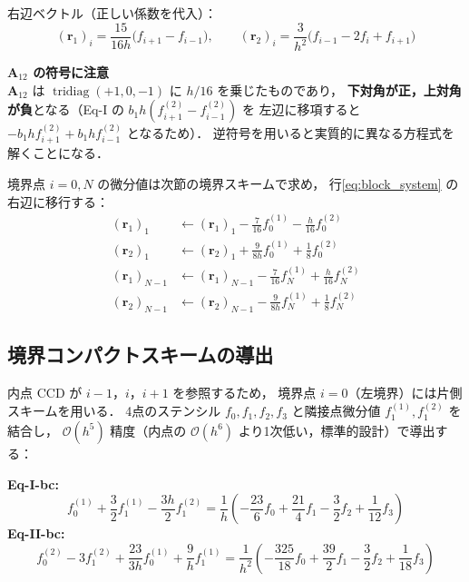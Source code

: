 \documentclass[12pt, a4paper, titlepage]{article}
\newcommand{\jp}[1]{{\normalfont\jpfont #1}}
\newcommand{\Ord}[1]{\mathcal{O}(#1)}
\newcommand{\fp}[1]{f^{(1)}_{#1}}
\newcommand{\fpp}[1]{f^{(2)}_{#1}}
\begin{document}
\jp{右辺ベクトル（正しい係数を代入）：}
\begin{equation}
  (\bm{r}_1)_i = \frac{15}{16h}\bigl(f_{i+1}-f_{i-1}\bigr),
  \qquad
  (\bm{r}_2)_i = \frac{3}{h^2}\bigl(f_{i-1}-2f_i+f_{i+1}\bigr)
  \label{eq:CCD_rhs}
\end{equation}

\begin{tcolorbox}[warnbox]
\textbf{$\bm{A}_{12}$ \jp{の符号に注意}}\\
\jp{$\bm{A}_{12}$ は $\operatorname{tridiag}(+1,0,-1)$ に $h/16$ を乗じたものであり，
\textbf{下対角が正，上対角が負}となる（Eq-I の $b_1 h(\fpp{i+1}-\fpp{i-1})$ を
左辺に移項すると $-b_1 h\fpp{i+1}+b_1 h\fpp{i-1}$ となるため）．
逆符号を用いると実質的に異なる方程式を解くことになる．}
\end{tcolorbox}

\jp{境界点 $i=0,N$ の微分値は次節の境界スキームで求め，
行\eqref{eq:block_system} の右辺に移行する：}
\begin{align}
  (\bm{r}_1)_1    &\leftarrow (\bm{r}_1)_1    - \tfrac{7}{16}\fp{0} - \tfrac{h}{16}\fpp{0}
  \\
  (\bm{r}_2)_1    &\leftarrow (\bm{r}_2)_1    + \tfrac{9}{8h}\fp{0} + \tfrac{1}{8}\fpp{0}
  \\
  (\bm{r}_1)_{N-1}&\leftarrow (\bm{r}_1)_{N-1} - \tfrac{7}{16}\fp{N} + \tfrac{h}{16}\fpp{N}
  \\
  (\bm{r}_2)_{N-1}&\leftarrow (\bm{r}_2)_{N-1} - \tfrac{9}{8h}\fp{N} + \tfrac{1}{8}\fpp{N}
\end{align}

\subsection{\jp{境界コンパクトスキームの導出}}

\jp{内点 CCD が $i-1$，$i$，$i+1$ を参照するため，
境界点 $i=0$（左境界）には片側スキームを用いる．
4点のステンシル $f_0, f_1, f_2, f_3$ と隣接点微分値 $\fp{1}, \fpp{1}$ を結合し，
$\Ord{h^5}$ 精度（内点の $\Ord{h^6}$ より1次低い，標準的設計）で導出する：}

\begin{tcolorbox}[mybox, title={\jp{左境界スキーム（$i=0$，$\Ord{h^5}$）}}]
\textbf{Eq-I-bc:}
\begin{equation}
  \fp{0} + \frac{3}{2}\fp{1} - \frac{3h}{2}\fpp{1}
  = \frac{1}{h}\!\left(
    -\frac{23}{6}f_0
    + \frac{21}{4}f_1
    - \frac{3}{2}f_2
    + \frac{1}{12}f_3
  \right)
  \label{eq:bc_I_left}
\end{equation}
\textbf{Eq-II-bc:}
\begin{equation}
  \fpp{0} - 3\fpp{1}
  + \frac{23}{3h}\fp{0}
  + \frac{9}{h}\fp{1}
  = \frac{1}{h^2}\!\left(
    -\frac{325}{18}f_0
    + \frac{39}{2}f_1
    - \frac{3}{2}f_2
    + \frac{1}{18}f_3
  \right)
  \label{eq:bc_II_left}
\end{equation}
\end{tcolorbox}
\end{document}
